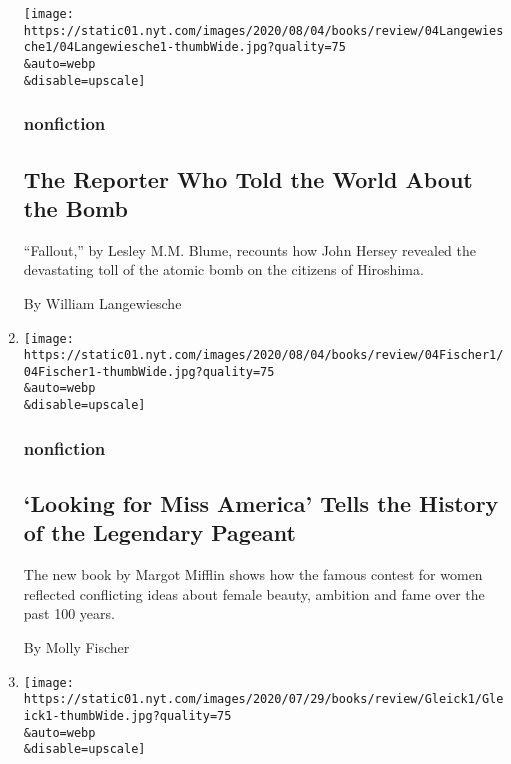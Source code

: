 \begin{enumerate}
  \texttt{[image: https://static01.nyt.com/images/2020/08/04/books/review/04Langewiesche1/04Langewiesche1-thumbWide.jpg?quality=75\\\&auto=webp\\\&disable=upscale]}

  \hypertarget{nonfiction-8}{%
  \subsubsection{nonfiction}\label{nonfiction-8}}

  \hypertarget{the-reporter-who-told-the-world-about-the-bomb}{%
  \subsection{The Reporter Who Told the World About the
  Bomb}\label{the-reporter-who-told-the-world-about-the-bomb}}

  ``Fallout,'' by Lesley M.M. Blume, recounts how John Hersey revealed
  the devastating toll of the atomic bomb on the citizens of Hiroshima.

  By William Langewiesche
\item
  \href{/2020/08/04/books/review/looking-for-miss-america-margot-mifflin.html}{}

  \texttt{[image: https://static01.nyt.com/images/2020/08/04/books/review/04Fischer1/04Fischer1-thumbWide.jpg?quality=75\\\&auto=webp\\\&disable=upscale]}

  \hypertarget{nonfiction-9}{%
  \subsubsection{nonfiction}\label{nonfiction-9}}

  \hypertarget{looking-for-miss-america-tells-the-history-of-the-legendary-pageant}{%
  \subsection{`Looking for Miss America' Tells the History of the
  Legendary
  Pageant}\label{looking-for-miss-america-tells-the-history-of-the-legendary-pageant}}

  The new book by Margot Mifflin shows how the famous contest for women
  reflected conflicting ideas about female beauty, ambition and fame
  over the past 100 years.

  By Molly Fischer
\item
  \href{/2020/08/04/books/review/the-end-of-everything-katie-mack.html}{}

  \texttt{[image: https://static01.nyt.com/images/2020/07/29/books/review/Gleick1/Gleick1-thumbWide.jpg?quality=75\\\&auto=webp\\\&disable=upscale]}


\end{enumerate}
